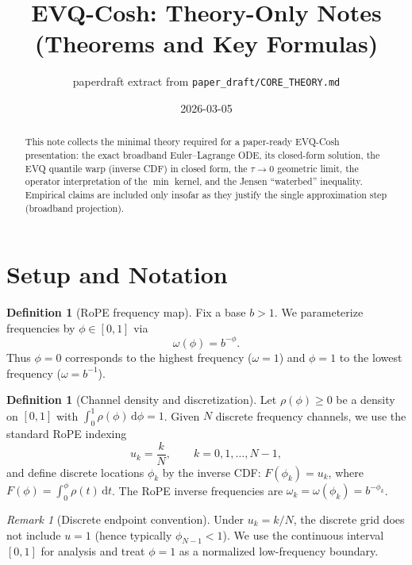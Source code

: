 \documentclass[11pt]{article}
\title{EVQ-Cosh: Theory-Only Notes (Theorems and Key Formulas)}
\author{paperdraft extract from \texttt{paper_draft/CORE\_THEORY.md}}
\date{2026-03-05}
\theoremstyle{plain}
\theoremstyle{definition}
\newtheorem{definition}[theorem]{Definition}
\theoremstyle{remark}
\newtheorem{remark}[theorem]{Remark}
\newcommand{\dd}{\,\mathrm{d}}
\begin{document}
\maketitle

\begin{abstract}
This note collects the minimal theory required for a paper-ready EVQ-Cosh
presentation: the exact broadband Euler--Lagrange ODE, its closed-form solution,
the EVQ quantile warp (inverse CDF) in closed form, the $\tau\to 0$ geometric
limit, the operator interpretation of the $\min$ kernel, and the Jensen
``waterbed'' inequality. Empirical claims are included only insofar as they
justify the single approximation step (broadband projection).
\end{abstract}

\section{Setup and Notation}

\begin{definition}[RoPE frequency map]
Fix a base $b>1$. We parameterize frequencies by $\phi\in[0,1]$ via
\begin{equation}
\omega(\phi)=b^{-\phi}.
\end{equation}
Thus $\phi=0$ corresponds to the highest frequency ($\omega=1$) and $\phi=1$ to
the lowest frequency ($\omega=b^{-1}$).
\end{definition}

\begin{definition}[Channel density and discretization]
Let $\rho(\phi)\ge 0$ be a density on $[0,1]$ with $\int_0^1\rho(\phi)\dd\phi=1$.
Given $N$ discrete frequency channels, we use the standard RoPE indexing
\begin{equation}
u_k=\frac{k}{N},\qquad k=0,1,\dots,N-1,
\end{equation}
and define discrete locations $\phi_k$ by the inverse CDF:
$F(\phi_k)=u_k$, where $F(\phi)=\int_0^\phi\rho(t)\dd t$.
The RoPE inverse frequencies are $\omega_k=\omega(\phi_k)=b^{-\phi_k}$.
\end{definition}

\begin{remark}[Discrete endpoint convention]
Under $u_k=k/N$, the discrete grid does not include $u=1$ (hence typically
$\phi_{N-1}<1$). We use the continuous interval $[0,1]$ for analysis and treat
$\phi=1$ as a normalized low-frequency boundary.
\end{remark}
\end{document}

